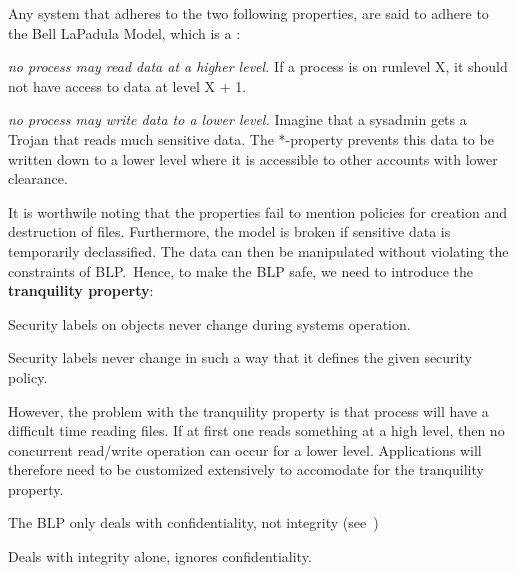 \begin{definition}
    Any system that adheres to the two following properties, are said to
    adhere to the Bell LaPadula Model, which is a :
    \begin{description}[labelindent=1cm]
        \item[Simple security property] 
            \textit{no process may read data at a higher level.}
            If a process is on runlevel X, it should not have access to data at level 
            X + 1.
        \item[*-property]
            \textit{no process may write data to a lower level.} Imagine 
            that a sysadmin gets a Trojan that reads much sensitive data. 
            The *-property prevents this data to be written down to a lower level
            where it is accessible to other accounts with lower clearance.
    \end{description}

    It is worthwile noting that the properties fail to mention policies
    for creation and destruction of files.
    Furthermore, the model is broken if sensitive data is temporarily declassified. 
    The data can then be manipulated without violating the constraints of BLP.\
    Hence, to make the BLP safe, we need to introduce the 
    \textbf{tranquility property}:
    \begin{description}[labelindent=1cm]
        \item[Strong:] 
            Security labels on objects never change during systems operation.
        \item[Weak:]
            Security labels never change in such a way that it defines the
            given security policy.
    \end{description}

    However, the problem with the tranquility property is that process will 
    have a difficult time reading files. If at first one reads something at 
    a high level, then no concurrent read/write operation can occur for a lower
    level. Applications will therefore need to be customized extensively to accomodate
    for the tranquility property.

    The BLP only deals with confidentiality, not integrity (see~)
\end{definition}

\begin{definition}
    Deals with integrity alone, ignores confidentiality.
\end{definition}

